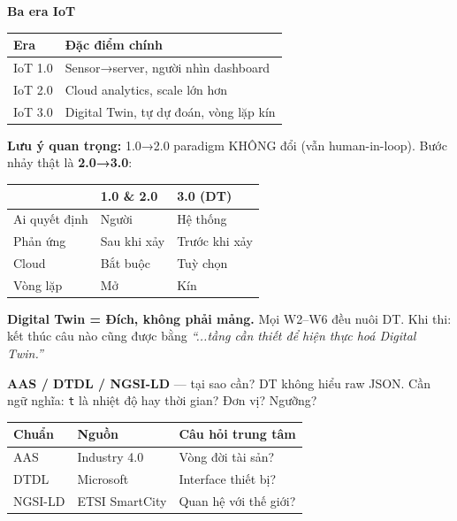 \documentclass[9pt,a4paper,twocolumn]{article}
\begin{document}
\begin{tcolorbox}[weekbox, title={W1 --- Kiến trúc IoT \& Digital Twin}]

\textbf{Ba era IoT}

\begin{tabular}{@{}p{1.6cm}p{3.8cm}@{}}
\toprule
\scriptsize Era & \scriptsize Đặc điểm chính \\
\midrule
\scriptsize IoT 1.0 & \scriptsize Sensor→server, người nhìn dashboard \\
\scriptsize IoT 2.0 & \scriptsize Cloud analytics, scale lớn hơn \\
\scriptsize IoT 3.0 & \scriptsize Digital Twin, tự dự đoán, vòng lặp kín \\
\bottomrule
\end{tabular}

\vspace{3pt}
\textbf{Lưu ý quan trọng:} 1.0→2.0 paradigm KHÔNG đổi (vẫn human-in-loop).
Bước nhảy thật là \textbf{2.0→3.0}:

\begin{tabular}{@{}p{2cm}p{1.5cm}p{1.9cm}@{}}
\toprule
\scriptsize & \scriptsize 1.0 \& 2.0 & \scriptsize 3.0 (DT) \\
\midrule
\scriptsize Ai quyết định & \scriptsize Người & \scriptsize Hệ thống \\
\scriptsize Phản ứng & \scriptsize Sau khi xảy & \scriptsize Trước khi xảy \\
\scriptsize Cloud & \scriptsize Bắt buộc & \scriptsize Tuỳ chọn \\
\scriptsize Vòng lặp & \scriptsize Mở & \scriptsize Kín \\
\bottomrule
\end{tabular}

\vspace{3pt}
\textbf{Digital Twin = Đích, không phải mảng.} Mọi W2--W6 đều nuôi DT.
Khi thi: kết thúc câu nào cũng được bằng
\textit{``...tầng cần thiết để hiện thực hoá Digital Twin.''}

\vspace{3pt}
\textbf{AAS / DTDL / NGSI-LD} --- tại sao cần? DT không hiểu raw JSON.
Cần ngữ nghĩa: \texttt{t} là nhiệt độ hay thời gian? Đơn vị? Ngưỡng?

\begin{tabular}{@{}p{1.2cm}p{1.8cm}p{2.4cm}@{}}
\toprule
\scriptsize Chuẩn & \scriptsize Nguồn & \scriptsize Câu hỏi trung tâm \\
\midrule
\scriptsize AAS & \scriptsize Industry 4.0 & \scriptsize Vòng đời tài sản? \\
\scriptsize DTDL & \scriptsize Microsoft & \scriptsize Interface thiết bị? \\
\scriptsize NGSI-LD & \scriptsize ETSI SmartCity & \scriptsize Quan hệ với thế giới? \\
\bottomrule
\end{tabular}

\end{tcolorbox}
\end{document}
